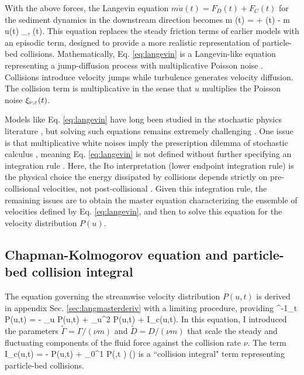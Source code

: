 With the above forces, the Langevin equation $m\dot{u}(t) = F_D(t) + F_C(t)$ for the sediment dynamics in the downstream direction becomes
\be m (t) = \Gamma + \eta(t) - m u(t) \xi_{\nu, \ve}(t). \label{eq:langevin} \ee
This equation replaces the steady friction terms of earlier models with an episodic term, designed to provide a more realistic representation of particle-bed collisions.
Mathematically, Eq. \ref{eq:langevin} is a Langevin-like equation representing a jump-diffusion process \citep{Daly2006} with multiplicative Poisson noise \citep{Dubkov2016,Denisov2009}. 
Collisions introduce velocity jumps while turbulence generates velocity diffusion. The collision term is multiplicative in the sense that $u$ multiplies the Poisson noise $\xi_{\nu,\varepsilon}(t)$.

Models like Eq. \ref{eq:langevin} have long been studied in the stochastic physics literature \citep{Hanggi1978,VanDenBroeck1983}, but solving such equations remains extremely challenging \citep{Daly2010,Mau2014,Dubkov2019}.
One issue is that multiplicative white noises imply the prescription dilemma of stochastic calculus \citep{Risken1989,Gardiner1983}, meaning Eq. \ref{eq:langevin} is not defined without further specifying an integration rule \citep{Suweis2011}.
Here, the Ito interpretation (lower endpoint integration rule) is the physical choice the energy dissipated by collisions depends strictly on pre-collisional velocities, not post-collisional \citep[e.g.][]{Gardiner1983}.
Given this integration rule, the remaining issues are to obtain the master equation characterizing the ensemble of velocities defined by Eq. \ref{eq:langevin}, and then to solve this equation for the velocity distribution $P(u)$.

\subsection{Chapman-Kolmogorov equation and particle-bed collision integral}

The equation governing the streamwise velocity distribution $P(u,t)$ is derived in appendix Sec. \ref{sec:langmasterderiv} with a limiting procedure, providing
\be \nu^{-1}\partial_t P(u,t) = - \tilde{\Gamma} \partial_u P(u,t) +  \partial_u^2 P(u,t) + I_c(u,t). \label{eq:master} \ee
In this equation, I introduced the parameters $\tilde{\Gamma} = \Gamma/(\nu m)$ and $\tilde{D} = D/(\nu m)$ that scale the steady and fluctuating components of the fluid force against the collision rate $\nu$. The term
\be I_c(u,t) = - P(u,t) + \int_0^1 P\big(,t \big) \rho(\ve) \label{eq:colint} \ee
is a ``collision integral" term representing particle-bed collisions.

